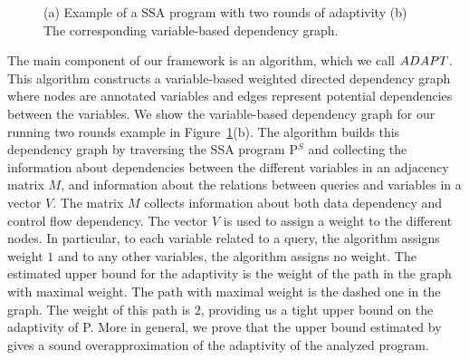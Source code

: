 \begin{figure}
\begin{subfigure}{.5\textwidth}
   \end{subfigure}
    \vspace{-0.3cm}
    \caption{(a) Example of a SSA program with two rounds of adaptivity (b) The corresponding variable-based dependency graph.}
    \vspace{-0.5cm}
    \label{fig:ssa_tworound}
\end{figure}
%

The main component of our framework is an algorithm, which we call ${ADAPT}$. This algorithm constructs a variable-based weighted directed dependency graph where nodes are annotated variables and edges represent potential dependencies between the variables. We show the variable-based dependency graph for our running two rounds example in Figure~\ref{fig:ssa_tworound}(b). The algorithm builds this dependency graph by traversing the SSA program P$^S$ and collecting the information about dependencies between the different variables in an adjacency matrix $M$, and information about the relations between queries and variables in a vector $V$. The matrix $M$ collects information about both data dependency and control flow dependency. The vector $V$ is used to assign a weight to the different nodes. In particular, to each variable related to a query, the algorithm assigns weight $1$ and to any other variables, the algorithm assigns no weight. The estimated upper bound for the adaptivity is the weight of the path in the graph with maximal weight.   The path with maximal weight is the dashed one in the graph. The weight of this path is $2$, providing us a tight upper bound on the adaptivity of P. More in general, we prove that the upper bound estimated by {\ADAPTSYSTEM} gives a sound overapproximation of the adaptivity of the analyzed program. 

